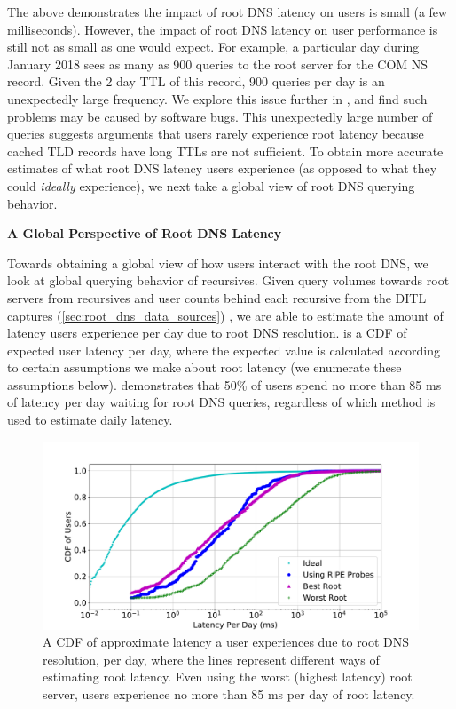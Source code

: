 \documentclass[sigconf,letterpaper,nonacm,10pt,anonymous]{acmart}
\begin{document}
The above demonstrates the impact of root DNS latency on users is small
(a few milliseconds). However, the impact of root DNS latency on user
performance is still not as small as one would expect. For example, a
particular day during January 2018 sees as many as 900 queries to the
root server for the COM NS record. Given the 2 day TTL of this record,
900 queries per day is an unexpectedly large frequency. We explore this
issue further in , and find such problems may
be caused by software bugs. This unexpectedly large number of queries
suggests arguments that users rarely experience root latency because
cached TLD records have long TTLs are not sufficient. To obtain more
accurate estimates of what root DNS latency users experience (as opposed
to what they could \emph{ideally} experience), we next take a global
view of root DNS querying behavior.

\textbf{A Global Perspective of Root DNS Latency}

Towards obtaining a global view of how users interact with the root DNS,
we look at global querying behavior of recursives. Given query volumes
towards root servers from recursives and user counts behind each
recursive from the DITL captures (\cref{sec:root_dns_data_sources}) , we
are able to estimate the amount of latency users experience per day due
to root DNS resolution.  is a CDF of
expected user latency per day, where the expected value is calculated
according to certain assumptions we make about root latency (we
enumerate these assumptions below). 
demonstrates that 50\% of users spend no more than 85 ms of latency per
day waiting for root DNS queries, regardless of which method is used to
estimate daily latency.

\begin{figure}
    \centering
    \includegraphics[width=\linewidth]{figures/user_root_latency_per_day.pdf}
    \caption{A CDF of approximate latency a user experiences due to root DNS resolution, per day, where the lines represent different ways of estimating root latency. Even using the worst (highest latency) root server, users experience no more than 85 ms per day of root latency.}
    \label{fig:user_root_latency_per_day}
\end{figure}
\end{document}
